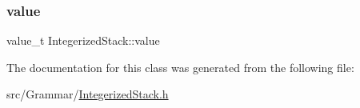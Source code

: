 \subsubsection{\texorpdfstring{value}{value}}
{\footnotesize\ttfamily value\+\_\+t Integerized\+Stack\+::value\hspace{0.3cm}{\ttfamily [protected]}}



The documentation for this class was generated from the following file\+:\begin{DoxyCompactItemize}
\item 
src/\+Grammar/\hyperlink{_integerized_stack_8h}{Integerized\+Stack.\+h}\end{DoxyCompactItemize}
